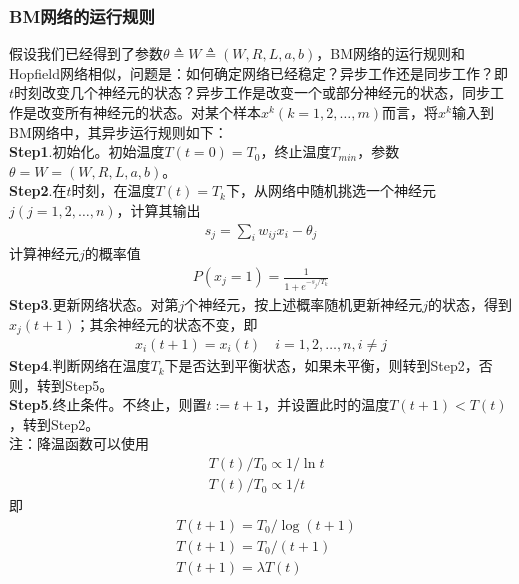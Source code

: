 {        \subsubsection{BM网络的运行规则}
            \par
            假设我们已经得到了参数$\theta \triangleq W \triangleq (W,R,L,a,b)$，BM网络的运行规则和Hopfield网络相似，问题是：如何确定网络已经稳定？异步工作还是同步工作？即$t$时刻改变几个神经元的状态？异步工作是改变一个或部分神经元的状态，同步工作是改变所有神经元的状态。对某个样本$x^k(k=1,2,\dots,m)$而言，将$x^k$输入到BM网络中，其异步运行规则如下：\\
            \textbf{Step1}.初始化。初始温度$T(t=0) = T_0$，终止温度$T_{min}$，参数$\theta=W=(W,R,L,a,b)$。\\
            \textbf{Step2}.在$t$时刻，在温度$T(t) = T_k$下，从网络中随机挑选一个神经元$j(j=1,2,\dots,n)$，计算其输出
            \begin{align*}
            s_j = \sum_{i} w_{ij}x_i - \theta_j
            \end{align*}
            计算神经元$j$的概率值
            \begin{align*}
            P(x_j=1) = \frac{1}{1+e^{-s_j /T_k}}
            \end{align*}
            \textbf{Step3}.更新网络状态。对第$j$个神经元，按上述概率随机更新神经元$j$的状态，得到$x_j(t+1)$；其余神经元的状态不变，即
            \begin{align*}
            x_i(t+1) = x_i(t)\quad i=1,2,\dots,n ,i\neq j
            \end{align*}
            \textbf{Step4}.判断网络在温度$T_k$下是否达到平衡状态，如果未平衡，则转到Step2，否则，转到Step5。\\
            \textbf{Step5}.终止条件。不终止，则置$t:=t+1$，并设置此时的温度$T(t+1) < T(t)$，转到Step2。\\
            注：降温函数可以使用
            \begin{align*}
            & T(t)/T_0 \propto 1/\ln t\\
            & T(t)/T_0 \propto 1/t
            \end{align*}
            即
            \begin{align*}
            & T(t+1) = T_0/\log (t+1)\\
            & T(t+1) = T_0/(t+1)\\
            & T(t+1) = \lambda T(t)
            \end{align*}

}
